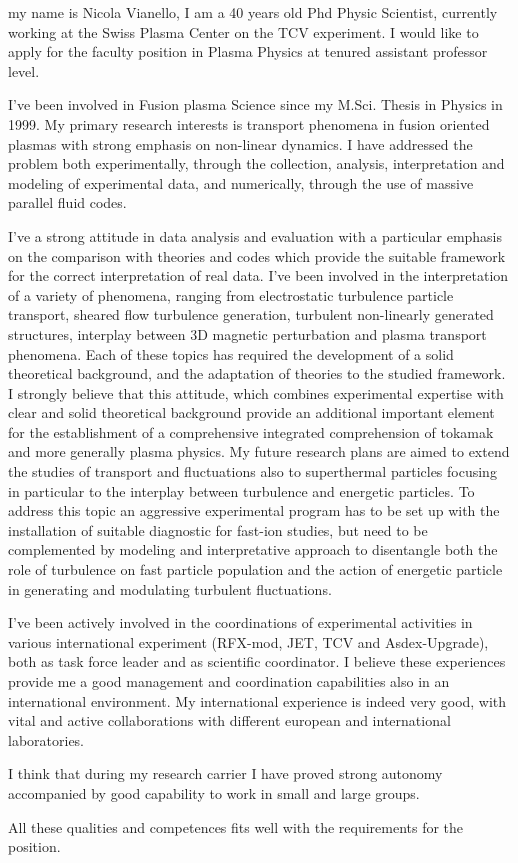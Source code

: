 \documentclass[12pt,stdletter,a4paper,dateno,sigleft]{newlfm}
\begin{document}
\begin{newlfm}
my name is Nicola Vianello, I am a 40 years old Phd Physic Scientist,
currently working at the Swiss Plasma Center on the TCV experiment. I would like to apply for
the faculty position in Plasma Physics at tenured assistant professor
level. 

I've been involved in Fusion plasma Science since my M.Sci. Thesis in
Physics in 1999. My primary research interests is transport phenomena in fusion
oriented plasmas with strong emphasis on non-linear dynamics. I have
addressed the problem both experimentally, through the collection, 
analysis, interpretation and modeling of experimental data, and
numerically, through the use of massive parallel fluid codes. 

I've a strong attitude in
data analysis and evaluation with a particular emphasis on the
comparison with theories and codes which provide the suitable framework for the
correct interpretation of real data. I've been involved in
the interpretation of a variety of phenomena, ranging from electrostatic
turbulence particle transport, sheared flow turbulence generation,
turbulent non-linearly generated structures, interplay between 3D
magnetic perturbation and plasma transport phenomena. Each of these
topics has required the development of a solid theoretical
background, and the adaptation of theories to the studied framework. I strongly believe that this
attitude, which combines experimental expertise  with clear and solid
theoretical background provide an additional important element for the
establishment of a comprehensive integrated comprehension of
tokamak and more generally plasma physics. My future research plans
are aimed to extend the studies of transport and fluctuations also to
superthermal particles focusing in particular to the interplay between
turbulence and energetic particles. To address this topic an
aggressive experimental program has to be set up with the installation
of suitable diagnostic for fast-ion studies, but need to be
complemented by modeling and interpretative approach to disentangle
both the role of turbulence on fast particle population and the action
of energetic particle in generating and modulating turbulent
fluctuations.  

I've been actively involved in the coordinations of experimental
activities in various international experiment (RFX-mod, JET, TCV and
Asdex-Upgrade), both as task force leader and as scientific
coordinator. I believe these experiences
provide me a good management and coordination capabilities also in an
international environment. My international experience is indeed very good, with vital and active
collaborations with different european and international laboratories. 

I think that during my research carrier I have proved strong autonomy
accompanied by good capability to work in small and large groups. 

All these qualities and competences fits well with the
requirements for the position. 

\end{newlfm}
\end{document}
